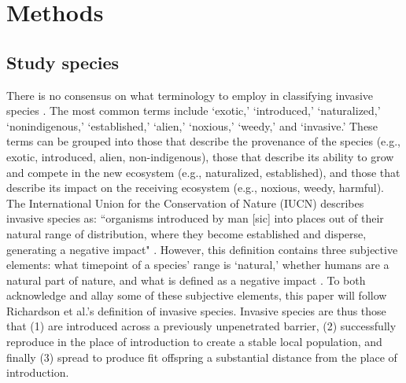 \documentclass[12pt]{article}\usepackage[]{graphicx}\usepackage[]{color}
\begin{document}
	\section{Methods}
	\subsection{Study species}
	There is no consensus on what terminology to employ in classifying invasive species \parencite{Colautti2004}. The most common terms include `exotic,' `introduced,' `naturalized,' `nonindigenous,' `established,' `alien,' `noxious,' `weedy,' and `invasive.' These terms can be grouped into those that describe the provenance of the species (e.g., exotic, introduced, alien, non-indigenous), those that describe its ability to grow and compete in the new ecosystem (e.g., naturalized, established), and those that describe its impact on the receiving ecosystem (e.g., noxious, weedy, harmful). The International Union for the Conservation of Nature (IUCN) describes invasive species as: ``organisms introduced by man [sic] into places out of their natural range of distribution, where they become established and disperse, generating a negative impact" \parencite{IUCN2008is}. However, this definition contains three subjective elements: what timepoint of a species' range is `natural,' whether humans are a natural part of nature, and what is defined as a negative impact \parencite{Munro2019}. To both acknowledge and allay some of these subjective elements, this paper will follow Richardson et al.'s \parencite{Richardson2000,Richardson2011} definition of invasive species. Invasive species are thus those that (1) are introduced across a previously unpenetrated barrier, (2) successfully reproduce in the place of introduction to create a stable local population, and finally (3) spread to produce fit offspring a substantial distance from the place of introduction.
	
\end{document}
